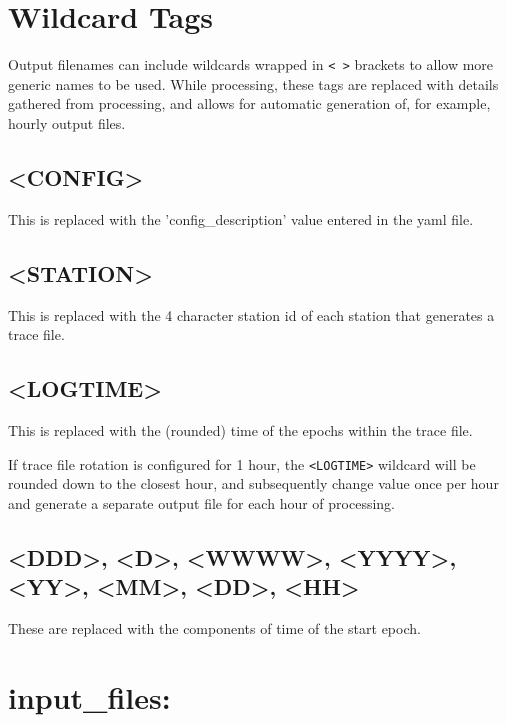 \section{Wildcard Tags}
Output filenames can include wildcards wrapped in \lstinline{< >} brackets to allow more generic names to be used. While processing, these tags are replaced with details gathered from processing, and allows for automatic generation of, for example, hourly output files.

\subsection*{\textless CONFIG\textgreater}
This is replaced with the 'config\_description' value entered in the yaml file.
\subsection*{\textless STATION\textgreater}
This is replaced with the 4 character station id of each station that generates a trace file.
\subsection*{\textless LOGTIME\textgreater}
This is replaced with the (rounded) time of the epochs within the trace file.

If trace file rotation is configured for 1 hour, the \lstinline{<LOGTIME>} wildcard will be rounded down to the closest hour, and subsequently change value once per hour and generate a separate output file for each hour of processing.

\subsection*
{\textless DDD\textgreater,
\textless D\textgreater, 
\textless WWWW\textgreater, 
\textless YYYY\textgreater, 
\textless YY\textgreater, 
\textless MM\textgreater, 
\textless DD\textgreater, 
\textless HH\textgreater}
These are replaced with the components of time of the start epoch.

















\section{input\_files:}


